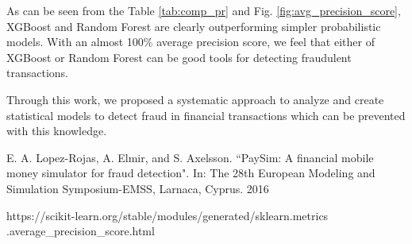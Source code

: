 \documentclass[letterpaper, 12 pt, conference]{ieeeconf}  %
\begin{document}
As can be seen from the Table \ref{tab:comp_pr} and Fig. \ref{fig:avg_precision_score}, XGBoost and Random Forest are clearly outperforming simpler probabilistic models. With an almost 100\% average precision score, we feel that either of XGBoost or Random Forest can be good tools for detecting fraudulent transactions.

Through this work, we proposed a systematic approach to analyze and create statistical models to detect fraud in financial transactions which can be prevented with this knowledge.
\begin{thebibliography}{99}

E. A. Lopez-Rojas, A. Elmir, and S. Axelsson. ``PaySim: A financial mobile money simulator for fraud detection". In: The 28th European Modeling and Simulation Symposium-EMSS, Larnaca, Cyprus. 2016

https://scikit-learn.org/stable/modules/generated/sklearn.metrics
.average\_precision\_score.html

\end{thebibliography}
\end{document}
